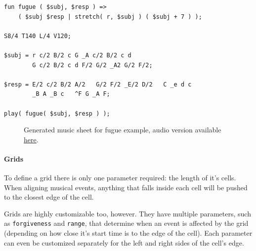 \documentclass[a4paper,UKenglish,cleveref, autoref]{oasics-v2019}
\begin{document}
\begin{lstlisting}[caption={Example of repeating the same note},label=list:7,captionpos=t,abovecaptionskip=-\medskipamount]
fun fugue ( $subj, $resp ) => 
    ( $subj $resp | stretch( r, $subj ) ( $subj + 7 ) );

S8/4 T140 L/4 V120;

$subj = r c/2 B/2 c G _A c/2 B/2 c d
        G c/2 B/2 c d F/2 G/2 _A2 G/2 F/2;

$resp = E/2 c/2 B/2 A/2   G/2 F/2 _E/2 D/2   C _e d c
        _B A _B c   ^F G _A F;

play( fugue( $subj, $resp ) );
\end{lstlisting}


\begin{figure}[ht]
  \centering
  {%
  \setlength{\fboxsep}{0pt}%
  \setlength{\fboxrule}{0pt}%
  }%
  \caption{Generated music sheet for fugue example, audio version available \href{https://drive.google.com/open?id=1dIfvnhhKn73Vpp0W6ss6RLsv6PQ_HFTF}{\underline{here}}.}
  \label{fig:fugue}
\end{figure}

\paragraph*{Grids}
To define a grid there is only one parameter required: the length of it's cells. When aligning musical events, anything that falls inside each cell will be pushed to the closest edge of the cell.

Grids are highly customizable too, however. They have multiple parameters, such as \texttt{forgiveness} and \texttt{range}, that determine when an event is affected by the grid (depending on how close it's start time is to the edge of the cell). Each parameter can even be customized separately for the left and right sides of the cell's edge.
\end{document}
